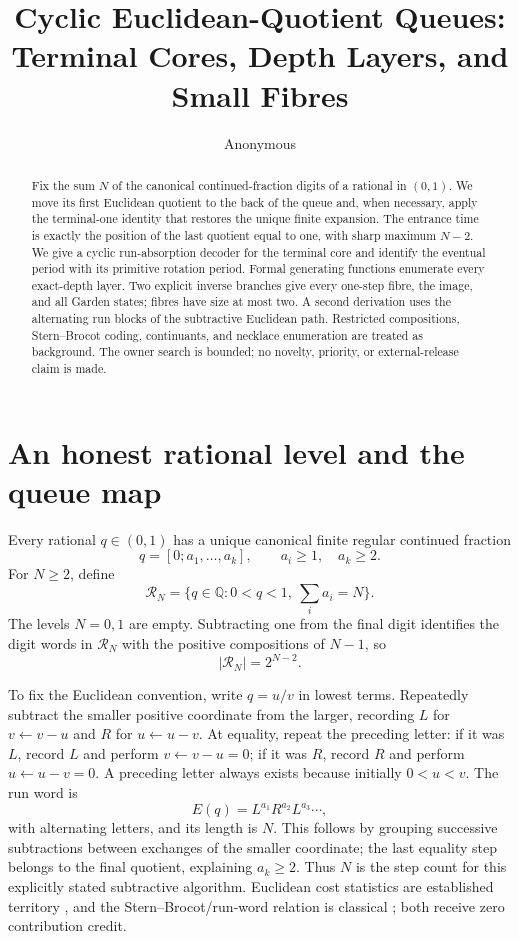 \documentclass[10pt,a4paper]{amsart}
\title[Cyclic Euclidean-quotient queues]{Cyclic Euclidean-Quotient Queues:\\
Terminal Cores, Depth Layers, and Small Fibres}
\author{Anonymous}
\date{}
\theoremstyle{definition}
\theoremstyle{remark}
\newcommand{\R}{\mathcal R}
\begin{document}
\begin{abstract}
Fix the sum $N$ of the canonical continued-fraction digits of a rational in
$(0,1)$.  We move its first Euclidean quotient to the back of the queue and,
when necessary, apply the terminal-one identity that restores the unique
finite expansion.  The entrance time is exactly the position of the last
quotient equal to one, with sharp maximum $N-2$.  We give a cyclic
run-absorption decoder for the terminal core and identify the eventual
period with its primitive rotation period.  Formal generating functions
enumerate every exact-depth layer.  Two explicit inverse branches give every
one-step fibre, the image, and all Garden states; fibres have size at most
two.  A second derivation uses the alternating run blocks of the subtractive
Euclidean path.  Restricted compositions, Stern--Brocot coding, continuants,
and necklace enumeration are treated as background.  The owner search is
bounded; no novelty, priority, or external-release claim is made.
\end{abstract}

\maketitle

\section{An honest rational level and the queue map}

Every rational $q\in(0,1)$ has a unique canonical finite regular continued
fraction
\[
 q=[0;a_1,\ldots,a_k],\qquad a_i\ge1,\quad a_k\ge2.
\]
For $N\ge2$, define
\[
 \R_N=\{q\in\mathbb Q:0<q<1,\ \textstyle\sum_i a_i=N\}.
\]
The levels $N=0,1$ are empty.  Subtracting one from the final digit identifies
the digit words in $\R_N$ with the positive compositions of $N-1$, so
\begin{equation}
                         |\R_N|=2^{N-2}.                \label{eq:size}
\end{equation}

To fix the Euclidean convention, write $q=u/v$ in lowest terms.  Repeatedly
subtract the smaller positive coordinate from the larger, recording $L$ for
$v\leftarrow v-u$ and $R$ for $u\leftarrow u-v$.  At equality, repeat the
preceding letter: if it was $L$, record $L$ and perform
$v\leftarrow v-u=0$; if it was $R$, record $R$ and perform
$u\leftarrow u-v=0$.  A preceding letter always exists because initially
$0<u<v$.  The run word is
\begin{equation}
 E(q)=L^{a_1}R^{a_2}L^{a_3}\cdots,                     \label{eq:path}
\end{equation}
with alternating letters, and its length is $N$.  This follows by grouping
successive subtractions between exchanges of the smaller coordinate; the
last equality step belongs to the final quotient, explaining $a_k\ge2$.
Thus $N$ is the step count for this explicitly stated subtractive algorithm.
Euclidean cost statistics are established territory
\cite{MinelliSourmelidisTechnau2023}, and the Stern--Brocot/run-word relation
is classical \cite{Reutenauer2019}; both receive zero contribution credit.
\end{document}
